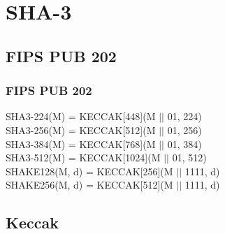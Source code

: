 \documentclass{beamer}
\begin{document}

\section{SHA-3}

\subsection{FIPS PUB 202}

\begin{frame}
\frametitle{FIPS PUB 202\footnotemark}
SHA3-224(M) = KECCAK[448](M $\vert \vert$ 01, 224) \\
SHA3-256(M) = KECCAK[512](M $\vert \vert$ 01, 256) \\
SHA3-384(M) = KECCAK[768](M $\vert \vert$ 01, 384) \\
SHA3-512(M) = KECCAK[1024](M $\vert \vert$ 01, 512) \\
SHAKE128(M, d) = KECCAK[256](M $\vert \vert$ 1111, d) \\
SHAKE256(M, d) = KECCAK[512](M $\vert \vert$ 1111, d)
\end{frame}

\subsection{Keccak}
\end{document}
